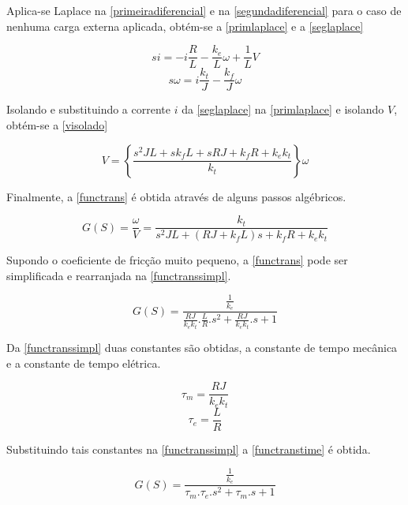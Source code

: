 \documentclass[
	12pt,				%
	openright,			%
	oneside,			%
	a4paper,			%
	english,			%
	french,				%
	spanish,			%
	brazil,				%
	]{abntex2}
\begin{document}
Aplica-se Laplace na \autoref{primeiradiferencial} e na \autoref{segundadiferencial} para o caso de nenhuma carga externa aplicada, obtém-se a \autoref{primlaplace} e a \autoref{seglaplace}

\begin{equation}
\label{primlaplace}
  si = -i\frac{R}{L} - \frac{k_e}{L}\omega + \frac{1}{L}V
\end{equation}
\begin{equation}
\label{seglaplace}
  s\omega = i\frac{k_t}{J} - \frac{k_f}{J}\omega
\end{equation}

Isolando e substituindo a corrente $i$ da \autoref{seglaplace} na \autoref{primlaplace} e isolando $V$, obtém-se a \autoref{visolado}

\begin{equation}
\label{visolado}
  V = \left\{\frac{s^2JL + sk_fL + sRJ + k_fR + k_ek_t}{k_t}\right\}\omega
\end{equation}

Finalmente, a \autoref{functrans} é obtida através de alguns passos algébricos.

\begin{equation}
\label{functrans}
  G(S) = \frac{\omega}{V} = \frac{k_t}{s^2JL + (RJ + k_fL)s + k_fR + k_ek_t}
\end{equation}

Supondo o coeficiente de fricção muito pequeno, a \autoref{functrans} pode ser simplificada e rearranjada na \autoref{functranssimpl}.

\begin{equation}
\label{functranssimpl}
  G(S) = \frac{\frac{1}{k_e}}{\frac{RJ}{k_ek_t}.\frac{L}{R}.s^2 + \frac{RJ}{k_ek_t}.s + 1}
\end{equation}

Da \autoref{functranssimpl} duas constantes são obtidas, a constante de tempo mecânica e a constante de tempo elétrica.

\begin{equation}
\label{mecConst}
  \tau_m = \frac{RJ}{k_ek_t}
\end{equation}
\begin{equation}
\label{eleConst}
  \tau_e = \frac{L}{R}
\end{equation}

Substituindo tais constantes na \autoref{functranssimpl} a \autoref{functranstime} é obtida.

\begin{equation}
\label{functranstime}
  G(S) = \frac{\frac{1}{k_e}}{\tau_m.\tau_e.s^2 + \tau_m.s + 1}
\end{equation}
\end{document}

